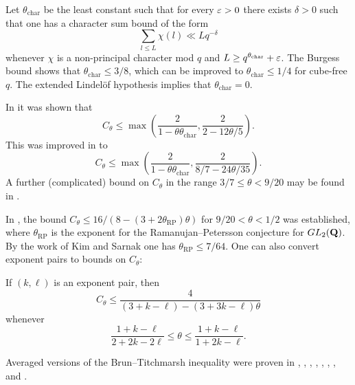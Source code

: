 Let $\theta_{\mathrm{char}}$ be the least constant such that for every $\varepsilon>0$ there exists $\delta>0$ such that one has a character sum bound of the form
$$ \sum_{l \leq L} \chi(l) \ll L q^{-\delta}$$
whenever $\chi$ is a non-principal character mod $q$ and $L \geq q^{\theta_{\mathrm{char}}}+\varepsilon$.  The Burgess bound \cite{burgess, burgess2} shows that $\theta_{\mathrm{char}} \leq 3/8$, which can be improved to $\theta_{\mathrm{char}} \leq 1/4$ for cube-free $q$.  The extended Lindel\"of hypothesis implies that $\theta_{\mathrm{char}}=0$.

In \cite[Theorem 3]{iwaniec_1982} it was shown that
$$ C_\theta \leq \max( \frac{2}{1 - \theta \theta_{\mathrm{char}}}, \frac{2}{2-12\theta/5}).$$
This was improved in \cite{lou-yao-1986} to
$$ C_\theta \leq \max( \frac{2}{1 - \theta \theta_{\mathrm{char}}}, \frac{2}{8/7-24\theta/35}).$$
A further (complicated) bound on $C_\theta$ in the range $3/7 \leq \theta < 9/20$ may be found in \cite[Theorem 2]{baker}.

In \cite{xi-zheng}, the bound $C_\theta \leq 16/(8-(3+2\theta_{\mathrm{RP}})\theta)$ for $9/20 < \theta < 1/2$ was established, where $\theta_{\mathrm{RP}}$ is the exponent for the Ramanujan--Petersson conjecture for $GL_2(\mathbf{Q})$.  By the work of Kim and Sarnak \cite{kim2003refined} one has $\theta_{\mathrm{RP}} \leq 7/64$.  One can also convert exponent pairs to bounds on $C_\theta$:

\begin{theorem}\label{convert}\cite[Theorem 1.4]{xi-zheng} If $(k,\ell)$ is an exponent pair, then
    $$ C_\theta \leq \frac{4}{(3+k-\ell) - (3+3k-\ell)\theta}$$
whenever
$$ \frac{1+k-\ell}{2+2k-2\ell} \leq \theta \leq \frac{1+k-\ell}{1+2k-\ell}.$$
\end{theorem}

Averaged versions of the Brun--Titchmarsh inequality were proven in \cite{HooleyBT1}, \cite{Hooleypa}, \cite{iwaniec_1982}, \cite{deshouillers-iwaniec-BT}, \cite{Fouvry1984}, \cite{Fouvry1985} \cite{mikawa_1991}, \cite{baker-harman-1996}, \cite{baker-harman-677} and \cite{li_average_2025}.

